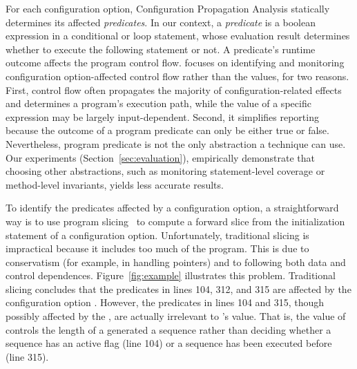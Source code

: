 For each configuration option, Configuration Propagation Analysis statically determines
its affected \textit{predicates}. In our context, a \textit{predicate}
is a boolean expression in a conditional or loop statement, whose evaluation result
determines whether to execute the following statement or not.
A predicate's runtime outcome affects the program control flow.
\ourtool focuses on identifying and monitoring 
configuration option-affected control flow
rather than the values, for two reasons. First, control flow 
often propagates the majority of configuration-related effects
and determines a program's execution path, while
the value of a specific expression may be largely input-dependent.
Second, it simplifies reporting because the outcome of a program predicate can only be
either true or false.  Nevertheless, program predicate is not the only
abstraction a technique can use. Our experiments (Section~\ref{sec:evaluation}),
empirically demonstrate that choosing other abstractions,
such as monitoring statement-level coverage
or method-level invariants, yields less accurate results.


To identify the predicates affected by a configuration option, a straightforward
way is to use program slicing~\cite{Horwitz:1988} to compute
a forward slice from the initialization statement of a
configuration option. Unfortunately, traditional slicing is impractical
because it includes too much of the program.  This is due to conservatism
(for example, in handling pointers) and to following both data and control
dependences.
Figure~\ref{fig:example} illustrates
this problem.  Traditional slicing concludes that the predicates
in lines 104, 312, and 315 are affected by the configuration option .
However, the predicates in lines 104 and 315, though possibly
affected by the , are actually irrelevant
to 's value. That is, the value of 
controls the length of a generated a sequence rather
than deciding whether a sequence has an active flag (line 104) or
a sequence has been executed before (line 315).

